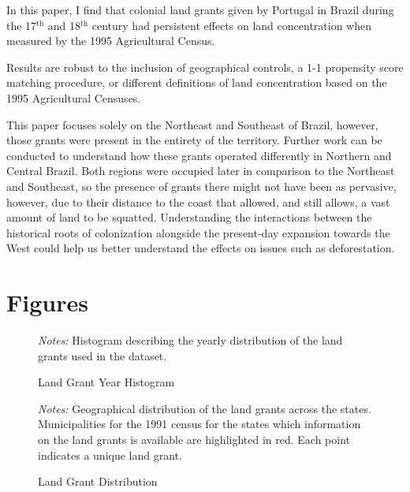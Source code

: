 \documentclass{article}
\begin{document}
In this paper, I find that colonial land grants given by Portugal in Brazil during the 17$^\text{th}$ and 18$^\text{th}$ century had persistent effects on land concentration when measured by the 1995 Agricultural Census.

Results are robust to the inclusion of geographical controls, a 1-1 propensity score matching procedure, or different definitions of land concentration based on the 1995 Agricultural Censuses.

This paper focuses solely on the Northeast and Southeast of Brazil, however, those grants were present in the entirety of the territory.
Further work can be conducted to understand how these grants operated differently in Northern and Central Brazil. 
Both regions were occupied later in comparison to the Northeast and Southeast, so the presence of grants there might not have been as pervasive, however, due to their distance to the coast that allowed, and still allows, a vast amount of land to be squatted. 
Understanding the interactions between the historical roots of colonization alongside the present-day expansion towards the West could help us better understand the effects on issues such as deforestation. 

\clearpage


\printbibliography

\clearpage

\section*{Figures}

\begin{figure}[h!]
  \caption{Land Grant Year Histogram}
  \begin{center}
  \end{center}
  \textit{Notes:} Histogram describing the yearly distribution of the land grants used in the dataset.  
  \label{fig:year_distribution}
\end{figure}

\begin{figure}[h!]
  \caption{Land Grant Distribution}
  \begin{center}
  \end{center}
  \textit{Notes:} Geographical distribution of the land grants across the states. Municipalities for the 1991 census for the states which information on the land grants is available are highlighted in red. Each point indicates a unique land grant. 
  \label{fig:land_grants_distribution}
\end{figure}
\end{document}
